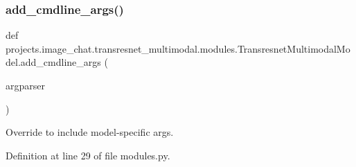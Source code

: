 \subsubsection{\texorpdfstring{add\+\_\+cmdline\+\_\+args()}{add\_cmdline\_args()}}
{\footnotesize\ttfamily def projects.\+image\+\_\+chat.\+transresnet\+\_\+multimodal.\+modules.\+Transresnet\+Multimodal\+Model.\+add\+\_\+cmdline\+\_\+args (\begin{DoxyParamCaption}\item[{}]{argparser }\end{DoxyParamCaption})\hspace{0.3cm}{\ttfamily [static]}}

\begin{DoxyVerb}Override to include model-specific args.
\end{DoxyVerb}
 

Definition at line 29 of file modules.\+py.


